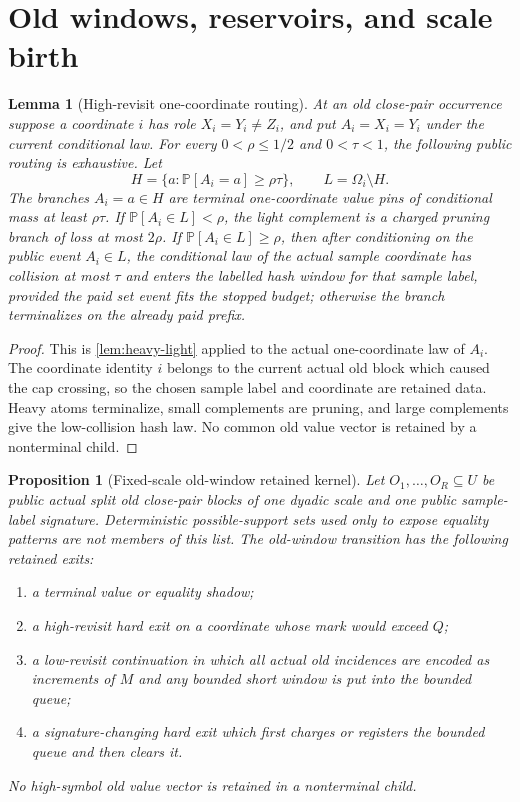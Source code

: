 \documentclass[11pt]{article}
\newcommand{\Cref}[1]{\ref{#1}}
\newtheorem{lemma}[theorem]{Lemma}
\newtheorem{proposition}[theorem]{Proposition}
\theoremstyle{remark}
\newcommand{\Prob}{\mathbb P}
\begin{document}
\section{Old windows, reservoirs, and scale birth}\label{sec:old-window}


\begin{lemma}[High-revisit one-coordinate routing]\label{lem:high-revisit}
At an old close-pair occurrence suppose a coordinate $i$ has role $X_i=Y_i\ne Z_i$, and put $A_i=X_i=Y_i$ under the current conditional law.  For every $0<\rho\le1/2$ and $0<\tau<1$, the following public routing is exhaustive.  Let
\[
        H=\{a:\Prob[A_i=a]\ge\rho\tau\},\qquad L=\Omega_i\setminus H.
\]
The branches $A_i=a\in H$ are terminal one-coordinate value pins of conditional mass at least $\rho\tau$.  If $\Prob[A_i\in L]<\rho$, the light complement is a charged pruning branch of loss at most $2\rho$.  If $\Prob[A_i\in L]\ge\rho$, then after conditioning on the public event $A_i\in L$, the conditional law of the actual sample coordinate has collision at most $\tau$ and enters the labelled hash window for that sample label, provided the paid set event fits the stopped budget; otherwise the branch terminalizes on the already paid prefix.
\end{lemma}

\begin{proof}
This is \Cref{lem:heavy-light} applied to the actual one-coordinate law of $A_i$.  The coordinate identity $i$ belongs to the current actual old block which caused the cap crossing, so the chosen sample label and coordinate are retained data.  Heavy atoms terminalize, small complements are pruning, and large complements give the low-collision hash law.  No common old value vector is retained by a nonterminal child.
\end{proof}

\begin{proposition}[Fixed-scale old-window retained kernel]\label{prop:old-window}
Let $O_1,\ldots,O_R\subseteq U$ be public actual split old close-pair blocks of one dyadic scale and one public sample-label signature.  Deterministic possible-support sets used only to expose equality patterns are not members of this list.  The old-window transition has the following retained exits:
\begin{enumerate}[label=\textup{(\roman*)}]
\item a terminal value or equality shadow;
\item a high-revisit hard exit on a coordinate whose mark would exceed $Q$;
\item a low-revisit continuation in which all actual old incidences are encoded as increments of $M$ and any bounded short window is put into the bounded queue;
\item a signature-changing hard exit which first charges or registers the bounded queue and then clears it.
\end{enumerate}
No high-symbol old value vector is retained in a nonterminal child.
\end{proposition}
\end{document}
